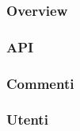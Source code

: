 \subsubsection {Overview}
\subsubsection {API}

\subsubsection {Commenti}
\subsubsection {Utenti}



